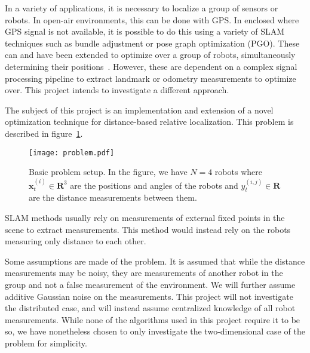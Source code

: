 In a variety of applications, it is necessary to localize a group of sensors or robots. In open-air environments, this can be done with GPS. In enclosed where GPS signal is not available, it is possible to do this using a variety of SLAM techniques such as bundle adjustment or pose graph optimization (PGO). These can and have been extended to optimize over a group of robots, simultaneously determining their positions~\cite{SLAM_distributed}. However, these are dependent on a complex signal processing pipeline to extract landmark or odometry measurements to optimize over. This project intends to investigate a different approach. 

The subject of this project is an implementation and extension of a novel optimization technique for distance-based relative localization. This problem is described in figure~\ref{fig:problem_desc}.
\begin{figure}[ht]
    \centering
    \texttt{[image: problem.pdf]}
    \caption{Basic problem setup. In the figure, we have $N=4$ robots where $\mathbf{x}^{(i)}_t \in \mathbf{R}^3$ are the positions and angles of the robots and $y^{(i,j)}_t \in \mathbf{R}$ are the distance measurements between them.}
    \label{fig:problem_desc}
\end{figure}

SLAM  methods usually rely on measurements of external fixed points in the scene to extract measurements. This method would instead rely on the robots measuring only distance to each other. 

Some assumptions are made of the problem. It is assumed that while the distance measurements may be noisy, they are measurements of another robot in the group and not a false measurement of the environment. We will further assume additive Gaussian noise on the measurements. This project will not investigate the distributed case, and will instead assume centralized knowledge of all robot measurements. While none of the algorithms used in this project require it to be so, we have nonetheless chosen to only investigate the two-dimensional case of the problem for simplicity. 